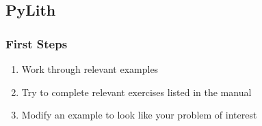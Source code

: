 \documentclass[aspectratio=169]{beamer}
\begin{document}
\subsection{PyLith}

\begin{frame}[fragile]
  \frametitle{First Steps}
  \summary{}

  \begin{enumerate}
    \begin{bashcode}
      cd PATH_TO_PYLITH_DIR
      mkdir playpen
      cp -r src/pylith-3.0.0/examples playpen/
    \end{bashcode}
  \item Work through relevant examples
  \item Try to complete relevant exercises listed in the manual
  \item Modify an example to look like your problem of interest
  \end{enumerate}

\end{frame}

 
\end{document}
